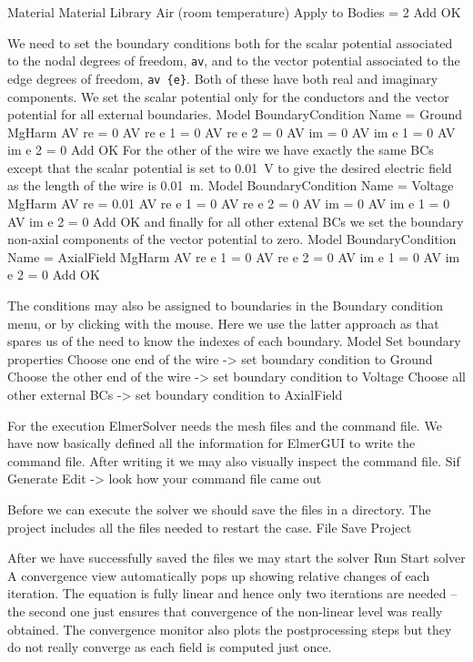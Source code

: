   Material
    Material Library
      Air (room temperature)
    Apply to Bodies = 2
    Add
    OK
\ttend

We need to set the boundary conditions both for the scalar potential associated to the nodal degrees of freedom, \texttt{av},
and to the vector potential associated to the edge degrees of freedom, \texttt{av \{e\}}.
Both of these have both real and imaginary components. 
We set the scalar potential only for the conductors and the vector potential for all external boundaries.
\ttbegin
Model
  BoundaryCondition
    Name = Ground 
    MgHarm
      AV re = 0
      AV re {e} 1 = 0
      AV re {e} 2 = 0
      AV im = 0
      AV im {e} 1 = 0
      AV im {e} 2 = 0
    Add
    OK
\ttend   
For the other of the wire we have exactly the same BCs except that the scalar potential is set to 0.01~V to give the desired
electric field as the length of the wire is 0.01~m. 
\ttbegin
Model
  BoundaryCondition
    Name = Voltage
    MgHarm
      AV re = 0.01
      AV re {e} 1 = 0
      AV re {e} 2 = 0
      AV im = 0
      AV im {e} 1 = 0
      AV im {e} 2 = 0
    Add
    OK
\ttend   
and finally for all other extenal BCs we set the boundary non-axial components of the vector potential to zero.
\ttbegin
Model
  BoundaryCondition
    Name = AxialField
    MgHarm
      AV re {e} 1 = 0
      AV re {e} 2 = 0
      AV im {e} 1 = 0
      AV im {e} 2 = 0
    Add
    OK
\ttend 


The conditions may also be assigned to boundaries in the Boundary condition menu, or 
by clicking with the mouse. Here we use the latter approach as that spares us of the 
need to know the indexes of each boundary.
\ttbegin
Model
  Set boundary properties
    Choose one end of the wire -> set boundary condition to Ground
    Choose the other end of the wire -> set boundary condition to Voltage
    Choose all other external BCs -> set boundary condition to AxialField
\ttend

For the execution 
ElmerSolver needs the mesh files and the command file. We have now basically defined
all the information for ElmerGUI to write the command file. After writing it we may also visually 
inspect the command file.
\ttbegin
Sif 
  Generate
  Edit -> look how your command file came out  
\ttend

Before we can execute the solver we should save the files in a directory. The project includes
all the files needed to restart the case.
\ttbegin
File 
  Save Project
\ttend

After we have successfully saved the files we may start the solver
\ttbegin
Run
  Start solver
\ttend
A convergence view automatically pops up showing relative changes of each iteration.
The equation is fully linear and hence only two iterations are needed -- the second 
one just ensures that convergence of the non-linear level was really obtained. 
The convergence monitor also plots the postprocessing steps but they do not really converge as each field is computed just once. 

